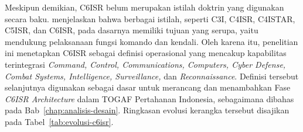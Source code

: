 Meskipun demikian, C6ISR belum merupakan istilah doktrin yang digunakan secara baku.
\textcite{Todorovic2025} menjelaskan bahwa berbagai istilah, seperti C3I, C4ISR, C4ISTAR, C5ISR, dan C6ISR, pada dasarnya memiliki tujuan yang serupa, yaitu mendukung pelaksanaan fungsi komando dan kendali.
Oleh karena itu, penelitian ini menetapkan C6ISR sebagai definisi operasional yang mencakup kapabilitas terintegrasi \textit{Command, Control, Communications, Computers, Cyber Defense, Combat Systems, Intelligence, Surveillance,} dan \textit{Reconnaissance}.
Definisi tersebut selanjutnya digunakan sebagai dasar untuk merancang dan menambahkan Fase \textit{C6ISR Architecture} dalam TOGAF Pertahanan Indonesia, sebagaimana dibahas pada Bab~\ref{chap:analisis-desain}.
Ringkasan evolusi kerangka tersebut disajikan pada Tabel~\ref{tab:evolusi-c6isr}.

